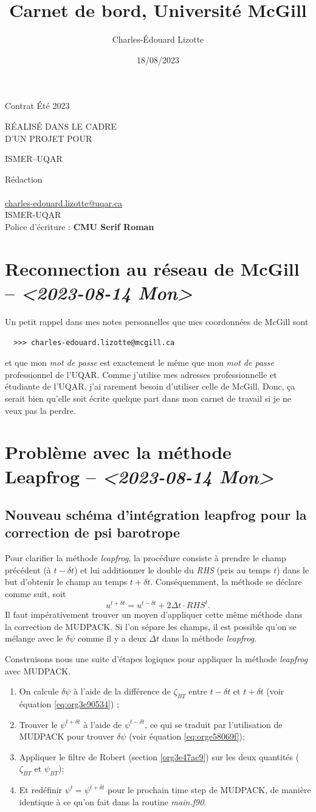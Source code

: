 \documentclass[10pt]{report}
\author{Charles-Édouard Lizotte}
\date{18/08/2023}
\title{Carnet de bord, Université McGill}
\makeatletter
\numberwithin{equation}{section}
\newcommand{\mytitlepage}{
\begin{titlepage}
\begin{center}
{\Huge Contrat Été 2023 \par}
\vspace{2cm}
{\Huge \MakeUppercase{\thetitle} \par}
\vspace{2cm}
RÉALISÉ DANS LE CADRE\\ D'UN PROJET POUR \par
\vspace{2cm}
{\Huge ISMER--UQAR \par}
\vspace{2cm}
{\thedate}
\end{center}
\vfill
Rédaction \\
{\theauthor}\\
\url{charles-edouard.lizotte@uqar.ca}\\
ISMER-UQAR\\
Police d'écriture : \textbf{CMU Serif Roman}
\end{titlepage}
}
\makeatother
\begin{document}
\mytitlepage
\tableofcontents\newpage

\section{Reconnection au réseau de McGill -- \textit{<2023-08-14 Mon>}}
\label{sec:orge2eee45}
Un petit rappel dans mes notes personnelles que mes coordonnées de McGill sont
\begin{verbatim}
  >>> charles-edouard.lizotte@mcgill.ca
\end{verbatim}
et que mon \emph{mot de passe} est exactement le même que mon \emph{mot de passe} professionnel de l'UQAR.
Comme j'utilise mes adresses professionnelle et étudiante de l'UQAR, j'ai rarement besoin d'utiliser celle de McGill.
Donc, ça serait bien qu'elle soit écrite quelque part dans mon carnet de travail si je ne veux pas la perdre.


\section{Problème avec la méthode Leapfrog -- \textit{<2023-08-14 Mon>}}
\label{sec:org06ff495}

\subsection{Nouveau schéma d'intégration leapfrog pour la correction de psi barotrope}
\label{sec:org907f18f}
Pour clarifier la méthode \emph{leapfrog}, la procédure consiste à prendre le champ précédent (à \(t-\delta t\)) et lui additionner le double du \emph{RHS} (pris au temps \(t\)) dans le but d'obtenir le champ au temps \(t+\delta t\).
Conséquemment, la méthode se déclare comme suit, soit
\begin{equation}
   u^{t+\delta t} = u^{t-\delta t} + 2\Delta t\cdot RHS^t.
\end{equation}
Il faut impérativement trouver un moyen d'appliquer cette même méthode dans la correction de MUDPACK.
Si l'on sépare les champs, il est possible qu'on se mélange avec le \(\delta \psi\) comme il y a deux \(\Delta t\) dans la méthode \emph{leapfrog}.\bigskip

Construisons nous une suite d'étapes logiques pour appliquer la méthode \emph{leapfrog} avec MUDPACK.
\begin{enumerate}
\item On calcule \(\delta \psi\) à l'aide de la différence de \(\zeta_{BT}\) entre \(t-\delta t\) et \(t+\delta t\) (voir équation \ref{eq:org3e90534}) ;
\item Trouver le \(\psi^{t+\delta t}\) à l'aide de \(\psi^{t-\delta t}\), ce qui se traduit par l'utilisation de MUDPACK pour trouver \(\delta \psi\) (voir équation \ref{eq:orge58069f});
\item Appliquer le filtre de Robert (section \ref{org3e47ac9})  sur les deux quantités (\(\zeta_{BT}\) et \(\psi_{BT}\));
\item Et redéfinir \(\psi^t = \psi^{t+\delta t}\) pour le prochain time step de MUDPACK, de manière identique à ce qu'on fait dans la routine \emph{main.f90}.
\end{enumerate}
\end{document}
